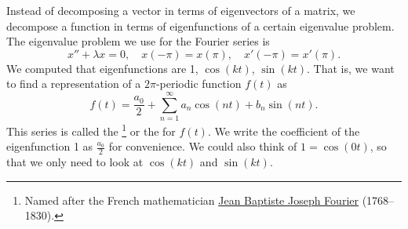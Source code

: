 \documentclass[12pt]{book}
\begin{document}
Instead of decomposing a vector in terms of eigenvectors of a matrix,
we decompose a function in terms of eigenfunctions of a certain
eigenvalue problem.  The eigenvalue problem we use for
the Fourier series is 
\begin{equation*}
x'' + \lambda x = 0, \quad x(-\pi) = x(\pi), \quad x'(-\pi) = x'(\pi) .
\end{equation*}
We computed that eigenfunctions are 1, $\cos (k t)$,
$\sin (k t)$.  That is, we want to find a representation of a
$2\pi$-periodic function $f(t)$ as
\begin{equation*}
\boxed{~~
f(t) = \frac{a_0}{2} +
\sum_{n=1}^\infty a_n \cos (n t) + b_n \sin (n t) .
~~}
\end{equation*}
This series is called the \emph{}%
\footnote{Named after the French mathematician
\href{http://en.wikipedia.org/wiki/Joseph_Fourier}{Jean Baptiste Joseph Fourier}
(1768--1830).} or the
\emph{} for $f(t)$.
We write the coefficient of the eigenfunction 1 as $\frac{a_0}{2}$
for convenience.
We could also think of $1 = \cos (0t)$, so that
we only need to look at $\cos (kt)$ and $\sin (kt)$.
\end{document}
